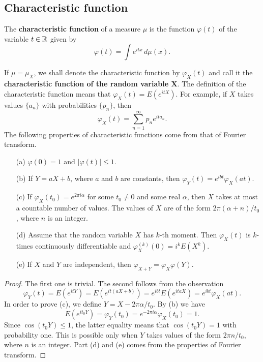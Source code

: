 \subsection{Characteristic function}
\begin{definition}
The \textbf{characteristic function} of a measure $\mu$ is the function $\varphi(t)$ of the variable $t\in\mathbb{R}$ given by
\[\varphi(t)=\int e^{it x}\,d\mu(x).\]
\end{definition}
If $\mu=\mu_X$, we shall denote the characteristic function by $\varphi_X(t)$ and call it the \textbf{characteristic function of the random variable $\bm{X}$}. The definition of the characteristic function means that $\varphi_X(t)=E(e^{it X})$. For example, if $X$ takes values $\{a_n\}$ with probabilities $\{p_n\}$, then
\[\varphi_X(t)=\sum_{n=1}^{\infty}p_ne^{it a_n}.\]
The following properties of characteristic functions come from that of Fourier transform.
\begin{proposition}\label{characteristic function prop}
\mbox{}
\begin{itemize}
\item[(a)] $\varphi(0)=1$ and $|\varphi(t)|\leq 1$.
\item[(b)] If $Y=aX+b$, where $a$ and $b$ are constants, then $\varphi_{Y}(t)=e^{i bt}\varphi_X(at)$.
\item[(c)] If $\varphi_X(t_0)=e^{2\pi i\alpha}$ for some $t_0\neq 0$ and some real $\alpha$, then $X$ takes at most a countable number of values. The values of $X$ are of the form $2\pi(\alpha+n)/t_0$, where $n$ is an integer.
\item[(d)] Assume that the random variable $X$ has $k$-th moment. Then $\varphi_X(t)$ is $k$-times continuously differentiable and $\varphi_X^{(k)}(0)=i^kE(X^k)$.
\item[(e)] If $X$ and $Y$ are independent, then $\varphi_{X+Y}=\varphi_X\varphi(Y)$. 
\end{itemize}
\end{proposition}
\begin{proof}
The first one is trivial. The second follows from the observation
\[\varphi_Y(t)=E(e^{it Y})=E(e^{it(aX+b)})=e^{ibt}E(e^{it aX})=e^{ibt}\varphi_X(at).\]
In order to prove (c), we define $Y=X-2\pi\alpha/t_0$. By (b) we have
\[E(e^{it_0Y})=\varphi_Y(t_0)=e^{-2\pi i\alpha}\varphi_X(t_0)=1.\]
Since $\cos(t_0Y)\leq 1$, the latter equality means that $\cos(t_0Y)=1$ with probability one. This is possible only when $Y$ takes values of the form $2\pi n/t_0$, where $n$ is an integer. Part (d) and (e) comes from the properties of Fourier transform.
\end{proof}
